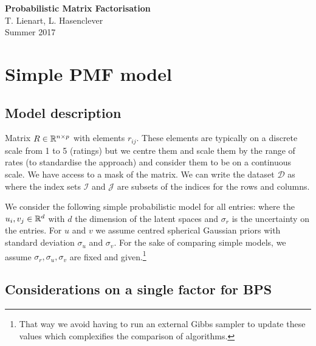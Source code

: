 

\setlength{\parindent}{0pt}



\begin{center}
	{\Large \bfseries Probabilistic Matrix Factorisation}\\[.5cm]
	{\large T. Lienart, L. Hasenclever}\\[.3cm]
	{Summer 2017}
\end{center}

\section{Simple PMF model}

\subsection{Model description}
Matrix $R\in\mathbb R^{n\times p}$ with elements $r_{ij}$. These elements are typically on a discrete scale from 1 to 5 (ratings) but we centre them and scale them by the range of rates (to standardise the approach) and consider them to be on a continuous scale. We have access to a mask of the matrix. We can write the dataset $\mathcal D$ as
%
%
where the index sets $\mathcal I$ and $\mathcal J$ are subsets of the indices for the rows and columns.

We consider the following simple probabilistic model for all entries:
%
%
where the $u_{i},v_{j} \in \mathbb R^{d}$ with $d$ the dimension of the latent spaces and $\sigma_{r}$ is the uncertainty on the entries. For $u$ and $v$ we assume centred spherical Gaussian priors with standard deviation $\sigma_{u}$ and $\sigma_{v}$. For the sake of comparing simple models, we assume $\sigma_{r}, \sigma_{u}, \sigma_{v}$ are fixed and given.\footnote{That way we avoid having to run an external Gibbs sampler to update these values which complexifies the comparison of algorithms.} 

\subsection{Considerations on a single factor for BPS}

